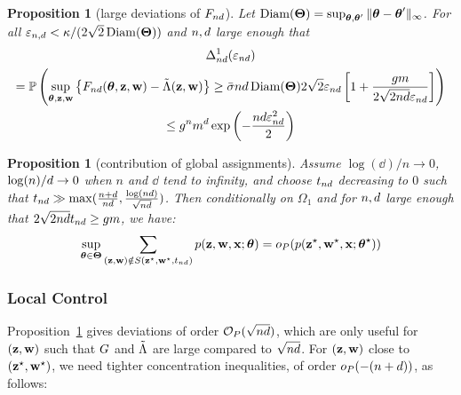 \documentclass[]{imsart}
\newcommand{\1}{\mathds{1}}
\numberwithin{equation}{section}
\theoremstyle{plain}
\newtheorem{proposition}[thm]{Proposition}
\theoremstyle{remark}
\begin{document}
\begin{proposition}[large deviations of $F_{nd}$]
  \label{prop:conditional-likelihood-convergence}
  Let $\operatorname{Diam}(\boldsymbol{\Theta}) = \sup_{\boldsymbol{\theta}, \boldsymbol{\theta}'} \|\boldsymbol{\theta} - \boldsymbol{\theta}' \|_{\infty}$. For all $\varepsilon_{n, d} < \kappa / (2\sqrt{2}\operatorname{Diam}(\boldsymbol{\Theta}))$ and $n, d$ large enough that 
  \begin{multline}
    \label{eq:conditional-likelihood-convergence}
    \Delta_{\n\dd}^1(\vareps_{\n\dd})\\ = \Prob\left( \sup_{\btheta, \bz, \bw} \left\{ \Fnd(\btheta, \bz, \bw) - \Lambtilde(\bz,\bw) \right\} \geq \vmax \n\dd \Diam(\bTheta) 2\sqrt{2}\vareps_{\n\dd}\left[1 + \frac{\g\m}{2\sqrt{2\n\dd}\vareps_{\n\dd}} \right] \right) \\ 
    \leq \g^{\n} \m^{\dd} \exp\left( - \frac{\n\dd\vareps_{\n\dd}^2} {2}\right)
  \end{multline}
\end{proposition}

\begin{proposition}[contribution of global assignments]
  \label{prop:large-deviations-profile-likelihood}
  Assume $\log(\dd)/n \to 0$, $\log(n)/d \to 0$ when $n$ and $\dd$ tend to infinity, and choose $t_{nd}$ decreasing to $0$ such that $t_{nd} \gg \max(\frac{n+d}{nd}, \frac{\log(nd)}{\sqrt{nd}})$. Then conditionally on $\Omega_1$ and for $n,d$ large enough that $2\sqrt{2nd}t_{nd} \geq gm$, we have:
  \begin{equation*}
    \sup_{\btheta \in \bTheta} \sum_{(\bz, \bw) \notin S(\bzs, \bws, \tnd)} \prob(\bz, \bw, \bx; \btheta) = \smallO_P( \prob(\bzs, \bws, \bx; \bthetas) )
  \end{equation*}
\end{proposition}

\subsubsection{Local Control}

Proposition~\ref{prop:conditional-likelihood-convergence} gives deviations of order $\mathcal{O}_{P}(\sqrt{nd})$, which are only useful for $(\mathbf{z}, \mathbf{w})$ such that $G$ and $\tilde{\Lambda}$ are large compared to $\sqrt{nd}$. For $(\mathbf{z}, \mathbf{w})$ close to $(\mathbf{z}^\star, \mathbf{w}^\star)$, we need tighter concentration inequalities, of order $o_P(-(n+d))$, as follows:
\end{document}
